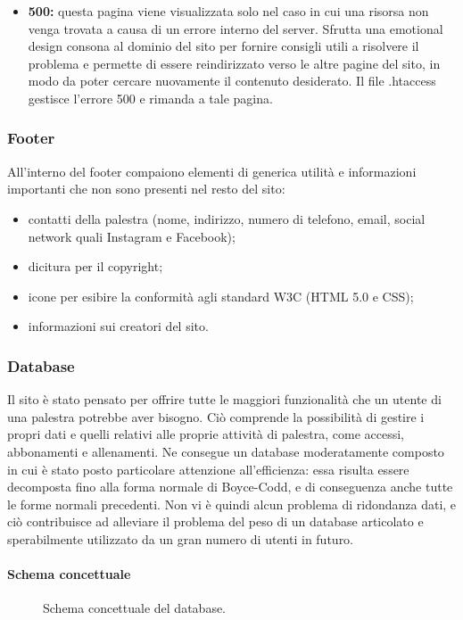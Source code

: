\documentclass[a4paper]{article}
\begin{document}
\begin{itemize}
		\item \textbf{500:} questa pagina viene visualizzata solo nel caso in cui una risorsa non venga trovata a causa di un errore interno del server. Sfrutta una emotional design consona al dominio del sito per fornire consigli utili a risolvere il problema e permette di essere reindirizzato verso le altre pagine del sito, in modo da poter cercare nuovamente il contenuto desiderato. Il file .htaccess gestisce l'errore 500 e rimanda a tale pagina.
	\end{itemize}
	
	\subsubsection{Footer}
	All'interno del footer compaiono elementi di generica utilità e informazioni importanti che non sono presenti nel resto del sito:
	\begin{itemize}
		\item contatti della palestra (nome, indirizzo, numero di telefono, email, social network quali Instagram e Facebook);
		\item dicitura per il copyright;
		\item icone per esibire la conformità agli standard W3C (HTML 5.0 e CSS);
		\item informazioni sui creatori del sito.
	\end{itemize}
	
	\subsubsection{Database}
	Il sito è stato pensato per offrire tutte le maggiori funzionalità che un utente di una palestra potrebbe aver bisogno. Ciò comprende la possibilità di gestire i propri dati e quelli relativi alle proprie attività di palestra, come accessi, abbonamenti e allenamenti. Ne consegue un database moderatamente composto in cui è stato posto particolare attenzione all'efficienza: essa risulta essere decomposta fino alla forma normale di Boyce-Codd, e di conseguenza anche tutte le forme normali precedenti. Non vi è quindi alcun problema di ridondanza dati, e ciò contribuisce ad alleviare il problema del peso di un database articolato e sperabilmente utilizzato da un gran numero di utenti in futuro.

	\paragraph{Schema concettuale}
	\begin{figure}
		\centering
		\caption{Schema concettuale del database.}
	\end{figure}
\end{document}
